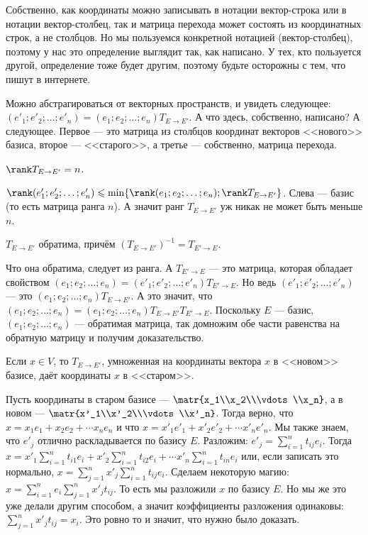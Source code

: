 \documentclass{article}
\begin{document}
\begin{itemize}
        \begin{Comment}
            Собственно, как координаты можно записывать в нотации вектор-строка или в нотации вектор-столбец, так и матрица перехода может состоять из координатных строк, а не столбцов. Но мы пользуемся конкретной нотацией (вектор-столбец), поэтому у нас это определение выглядит так, как написано. У тех, кто пользуется другой, определение тоже будет другим, поэтому будьте осторожны с тем, что пишут в интернете.
        \end{Comment}
        \begin{Comment}
           Можно абстрагироваться от векторных пространств, и увидеть следующее: $(e'_1;e'_2;\ldots;e'_n)=(e_1;e_2;\ldots;e_n)T_{E\to E'}$. А что здесь, собственно, написано? А следующее. Первое --- это матрица из столбцов координат векторов <<нового>> базиса, второе --- <<старого>>, а третье --- собственно, матрица перехода.
        \end{Comment}
        \thm $\rank T_{E\to E'}=n$.
        \begin{Proof}
            $\rank(e'_1;e'_2;\ldots;e'_n)\leqslant\min\{\rank(e_1;e_2;\ldots;e_n);\rank T_{E\to E'}\}$. Слева --- базис (то есть матрица ранга $n$). А значит ранг $T_{E\to E'}$ уж никак не может быть меньше $n$.
        \end{Proof}
        \thm $T_{E\to E'}$ обратима, причём $(T_{E\to E'})^{-1}=T_{E'\to E}$.
        \begin{Proof}
            Что она обратима, следует из ранга. А $T_{E'\to E}$ --- это матрица, которая обладает свойством $(e_1;e_2;\ldots;e_n)=(e'_1;e'_2;\ldots;e'_n)T_{E'\to E}$. Но ведь $(e'_1;e'_2;\ldots;e'_n)$ --- это $(e_1;e_2;\ldots;e_n)T_{E\to E'}$. А это значит, что $(e_1;e_2;\ldots;e_n)=(e_1;e_2;\ldots;e_n)T_{E\to E'}T_{E'\to E}$. Поскольку $E$ --- базис, $(e_1;e_2;\ldots;e_n)$ --- обратимая матрица, так домножим обе части равенства на обратную матрицу и получим доказательство.
        \end{Proof}
        \thm Если $x\in V$, то $T_{E\to E'}$, умноженная на координаты вектора $x$ в <<новом>> базисе, даёт координаты $x$ в <<старом>>.
        \begin{Proof}
            Пусть координаты в старом базисе --- $\matr{x_1\\x_2\\\vdots\\x_n}$, а в новом --- $\matr{x'_1\\x'_2\\\vdots\\x'_n}$. Тогда верно, что $x=x_1e_1+x_2e_2+\cdots x_ne_n$ и что $x=x'_1e'_1+x'_2e'_2+\cdots x'_ne'_n$. Мы также знаем, что $e'_j$ отлично раскладывается по базису $E$. Разложим: $e'_j=\sum\limits_{i=1}^nt_{ij}e_i$. Тогда $x=x'_1\sum\limits_{i=1}^nt_{i1}e_i+x'_2\sum\limits_{i=1}^nt_{i2}e_i+\cdots x'_n\sum\limits_{i=1}^nt_{in}e_i$ или, если записать это нормально, $x=\sum\limits_{j=1}^nx'_j\sum\limits_{i=1}^nt_{ij}e_i$. Сделаем некоторую магию: $x=\sum\limits_{i=1}^ne_i\sum\limits_{j=1}^nx'_jt_{ij}$. То есть мы разложили $x$ по базису $E$. Но мы же это уже делали другим способом, а значит коэффициенты разложения одинаковы: $\sum\limits_{j=1}^nx'_jt_{ij}=x_i$. Это ровно то и значит, что нужно было доказать.

\end{Proof}
\end{itemize}
\end{document}
